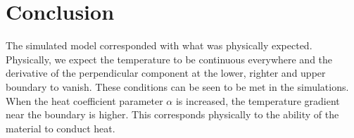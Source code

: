 \section{Conclusion}
The simulated model corresponded with what was physically expected. Physically, we expect the temperature to be continuous everywhere and the derivative of the perpendicular component at the lower, righter and upper boundary to vanish. These conditions can be seen to be met in the simulations. When the heat coefficient parameter $\alpha$ is increased, the temperature gradient near the boundary is higher. This corresponds physically to the ability of the material to conduct heat.